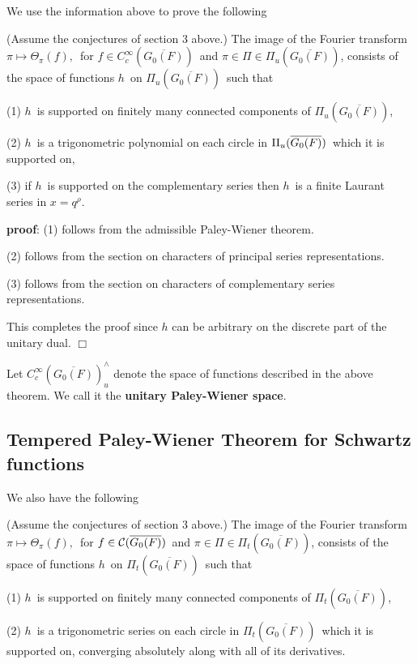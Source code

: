 We use the information above to prove the following

\begin{theorem}
(Assume the conjectures of section 3 above.) The image of the Fourier
transform $\pi \longmapsto \Theta _\pi (f),$\ for $f\in C_c^\infty (%
\overline{G_0(F)})$\ and $\pi \in \Pi \in \Pi _u(\overline{G_0(F)})$,
consists of the space of functions $h$\ on $\Pi _u(\overline{G_0(F)})$\ such
that

(1) $h$\ is supported on finitely many connected components of $\Pi _u(%
\overline{G_0(F)})$,

(2) $h$\ is a trigonometric polynomial on each circle in $\Pi _u(\overline{%
G_0(F)})$\ which it is supported on,

(3) if $h$\ is supported on the complementary series then $h$\ is a finite
Laurant series in $x=q^\rho .$
\end{theorem}

{\bf proof}: (1) follows from the admissible Paley-Wiener theorem.

(2) follows from the section on characters of principal series
representations.

(3) follows from the section on characters of complementary series
representations.

This completes the proof since $h$ can be arbitrary on the discrete part of
the unitary dual. $\Box $

Let $C_c^\infty (\overline{G_0(F)})_u^{\wedge }$ denote the space of
functions described in the above theorem. We call it the {\bf unitary
Paley-Wiener space}.

\subsection{Tempered Paley-Wiener Theorem for Schwartz functions}

We also have the following

\begin{theorem}
(Assume the conjectures of section 3 above.) The image of the Fourier
transform $\pi \longmapsto \Theta _\pi (f),$\ for $f\in {\cal C}(\overline{%
G_0(F)})$\ and $\pi \in \Pi \in \Pi _t(\overline{G_0(F)})$, consists of the
space of functions $h$\ on $\Pi _t(\overline{G_0(F)})$\ such that

(1) $h$\ is supported on finitely many connected components of $\Pi _t(%
\overline{G_0(F)})$,

(2) $h$\ is a trigonometric series on each circle in $\Pi _t(\overline{G_0(F)%
})$\ which it is supported on, converging absolutely along with all of its
derivatives.
\end{theorem}


